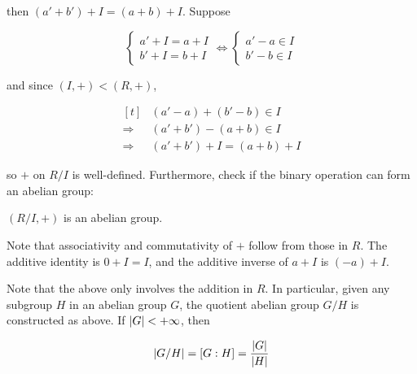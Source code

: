 \documentclass[a4paper,12pt]{article}
\begin{document}
then $(a'+b')+I=(a+b)+I$. Suppose

$$\begin{cases}
  a'+I=a+I\\
  b'+I=b+I
\end{cases}\Leftrightarrow\begin{cases}
  a'-a\in I\\
  b'-b\in I
\end{cases}$$\s

and since $(I,+)<(R,+)$,

$$\begin{aligned}[t]
  &(a'-a)+(b'-b)\in I\\
  \Rightarrow&(a'+b')-(a+b)\in I\\
  \Rightarrow&(a'+b')+I=(a+b)+I
\end{aligned}$$\s

so $+$ on $R/I$ is well-defined. Furthermore, check if the binary operation can form an abelian group:\n

\begin{pst}
  $(R/I,+)$ is an abelian group.\n

  \prf Note that associativity and commutativity of $+$ follow from those in $R$. The additive identity is $0+I=I$, and the additive inverse of $a+I$ is $(-a)+I$.
\end{pst}\n

Note that the above only involves the addition in $R$. In particular, given any subgroup $H$ in an abelian group $G$, the quotient abelian group $G/H$ is constructed as above. If $\left| G\right|<+\infty$, then

$$\left| G/H\right|=[G:H]=\frac{\left| G\right|}{\left| H\right|}$$\s
\end{document}
